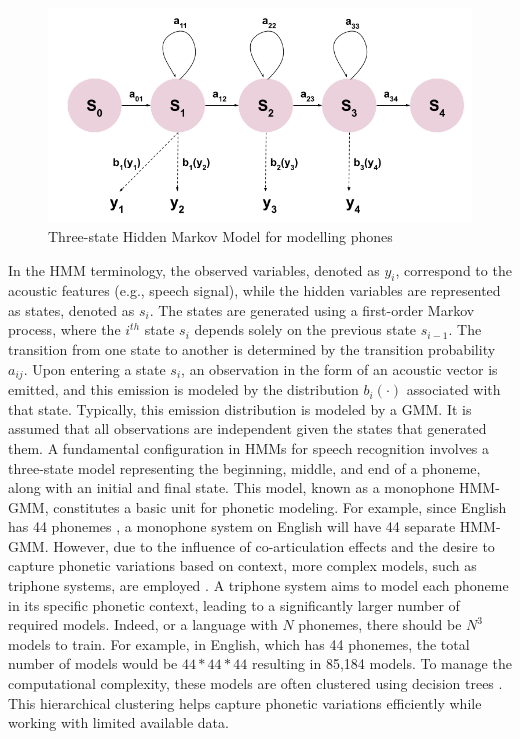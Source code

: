 \begin{figure}
    \begin{center}
    \includegraphics[scale=0.3]{imgs/HMM_monophone.png}
    \caption{Three-state Hidden Markov Model for modelling phones}
    \label{HMM_monophone}    
    \end{center}
\end{figure}
In the HMM terminology, the observed variables, denoted as $y_i$, correspond to the acoustic features (e.g., speech signal), while the hidden variables are represented as states, denoted as $s_i$. The states are generated using a first-order Markov process, where the $i^{th}$ state $s_i$ depends solely on the previous state $s_{i-1}$. The transition from one state to another is determined by the transition probability $a_{ij}$. Upon entering a state $s_i$, an observation in the form of an acoustic vector is emitted, and this emission is modeled by the distribution $b_i(\cdot)$ associated with that state. Typically, this emission distribution is modeled by a GMM. It is assumed that all observations are independent given the states that generated them. A fundamental configuration in HMMs for speech recognition involves a three-state model representing the beginning, middle, and end of a phoneme, along with an initial and final state. This model, known as a monophone HMM-GMM, constitutes a basic unit for phonetic modeling. For example, since English has 44 phonemes \cite{bizzocchi2017many}, a monophone system on English will have 44 separate HMM-GMM. However, due to the influence of co-articulation effects and the desire to capture phonetic variations based on context, more complex models, such as triphone systems, are employed \cite{schwartz1985context}. A triphone system aims to model each phoneme in its specific phonetic context, leading to a significantly larger number of required models.  Indeed, or a language with $N$ phonemes, there should be $N^3$ models to train. For example, in English, which has 44 phonemes, the total number of models would be  $44 * 44 * 44$ resulting in 85,184 models. To manage the computational complexity, these models are often clustered using decision trees \cite{bahl1991context}. This hierarchical clustering helps capture phonetic variations efficiently while working with limited available data.
